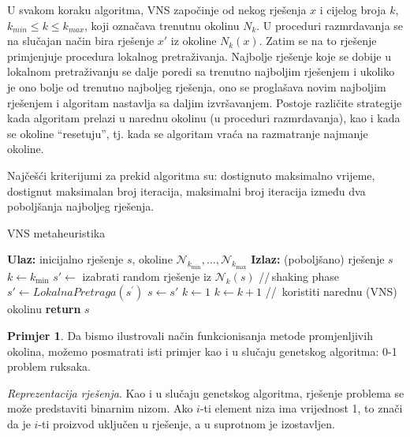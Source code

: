 \documentclass[a4paper, utf8, 11pt, colorlinks]{book}
\theoremstyle{definition}
\newtheorem{primjer}{Primjer}[chapter]
\begin{document}
U svakom koraku algoritma, VNS započinje od nekog rješenja $x$ i cijelog broja $k$, $k_{min}\leqslant k\leqslant k_{max}$, koji označava trenutnu okolinu $N_k$. U proceduri razmrdavanja
se na slučajan način bira rješenje  $x'$ iz okoline  $N_k(x)$. Zatim se na to rješenje primjenjuje procedura lokalnog pretraživanja. Najbolje rješenje koje se dobije u lokalnom pretraživanju se dalje poredi sa trenutno najboljim rješenjem i ukoliko je ono bolje od trenutno najboljeg rješenja, ono se proglašava novim najboljim rješenjem i algoritam nastavlja sa daljim izvršavanjem. Postoje različite strategije kada algoritam prelazi u narednu okolinu (u proceduri razmrdavanja), kao i kada se okoline ``resetuju'', tj. kada se algoritam vraća na razmatranje najmanje okoline. 

Najčešći kriterijumi za prekid   algoritma su: dostignuto maksimalno  vrijeme, dostignut maksimalan broj iteracija, maksimalni broj iteracija između dva poboljšanja najboljeg rješenja. %

    \begin{algorithm}[!t] 
	\caption{VNS metaheuristika}\label{alg:vns}
	\begin{algorithmic}[1]
		\STATE \textbf{Ulaz:} inicijalno rješenje $s$, okoline $\mathcal{N}_{k_{\min}},\ldots, \mathcal{N}_{k_{\max}}$ 
		\STATE \textbf{Izlaz:} (poboljšano) rješenje $s$
		\STATE $k \gets  k_{\min}$
		\STATE  $s' \gets$ izabrati random rješenje iz $\mathcal{N}_k(s)$ \hspace{0.3cm}//\,shaking phase 
		\STATE $s' \gets  LokalnaPretraga(s^{'})$
		\STATE $s \gets s'$
		\STATE $k \gets 1$
		\ELSE 
		\STATE $k \gets k+1$ \hspace{0.3cm}//\, koristiti narednu (VNS) okolinu
		\ENDIF
		\ENDWHILE
		\ENDWHILE
		\STATE \textbf{return} $s$
	\end{algorithmic}
\end{algorithm}


\begin{primjer} Da bismo ilustrovali način funkcionisanja metode promjenljivih okolina, možemo posmatrati isti primjer kao i u slučaju genetskog algoritma: 0-1 problem ruksaka. 
\end{primjer}

\emph{Reprezentacija rješenja}. Kao i u slučaju genetskog algoritma, rješenje problema se može predstaviti binarnim nizom. Ako $i$-ti element niza ima vrijednost 1, to znači da je $i$-ti proizvod uključen u rješenje, a u suprotnom je izostavljen.
\end{document}
